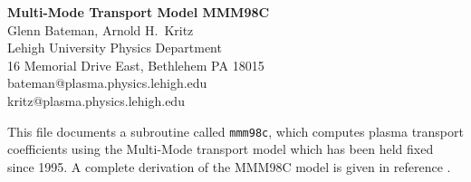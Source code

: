 %
 
\headheight 0pt \headsep 0pt  \topmargin 0pt  \oddsidemargin 0pt
\textheight 9.0in \textwidth 6.5in

\begin{center}
\Large {\bf Multi-Mode Transport Model MMM98C} \\
\vspace{1pc} \normalsize
Glenn Bateman, Arnold H.~Kritz \\
 Lehigh University Physics Department \\
16 Memorial Drive East, Bethlehem PA 18015 \\
bateman@plasma.physics.lehigh.edu \\
kritz@plasma.physics.lehigh.edu
\end{center}

This file documents a subroutine called {\tt mmm98c}, which computes
plasma transport coefficients using the Multi-Mode transport model
which has been held fixed since 1995.  A complete derivation of the
MMM98C model is given in reference \cite{bate98a}.

